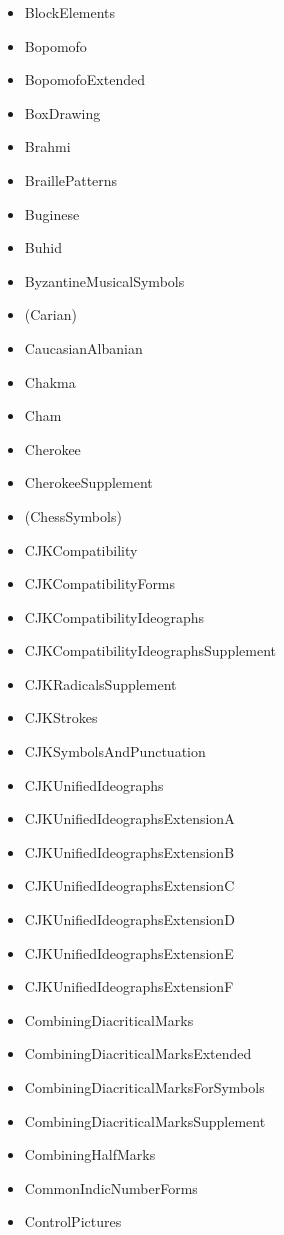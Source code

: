 \documentclass{article}
\newenvironment{itemlist}{%
  \begin{itemize}
	\setlength{\itemsep}{0pt}
	\setlength{\parsep}{0pt}
	\setlength{\topsep}{0pt}
	\setlength{\partopsep}{0pt}
	\setlength{\parskip}{0pt}
	\setlength{\labelsep}{5pt}}%
{
  \end{itemize}}
\begin{document}
\begin{multicols*}{2}
\begin{itemlist}
				\item BlockElements
				\item Bopomofo
				\item BopomofoExtended
				\item BoxDrawing
				\item Brahmi
				\item BraillePatterns
				\item Buginese
				\item Buhid
				\item ByzantineMusicalSymbols
				\item (Carian)
				\item CaucasianAlbanian
				\item Chakma
				\item Cham
				\item Cherokee
				\item CherokeeSupplement
				\item (ChessSymbols)
				\item CJKCompatibility
				\item CJKCompatibilityForms
				\item CJKCompatibilityIdeographs
				\item CJKCompatibilityIdeographsSupplement
				\item CJKRadicalsSupplement
				\item CJKStrokes
				\item CJKSymbolsAndPunctuation
				\item CJKUnifiedIdeographs
				\item CJKUnifiedIdeographsExtensionA
				\item CJKUnifiedIdeographsExtensionB
				\item CJKUnifiedIdeographsExtensionC
				\item CJKUnifiedIdeographsExtensionD
				\item CJKUnifiedIdeographsExtensionE
				\item CJKUnifiedIdeographsExtensionF
				\item CombiningDiacriticalMarks
				\item CombiningDiacriticalMarksExtended
				\item CombiningDiacriticalMarksForSymbols
				\item CombiningDiacriticalMarksSupplement
				\item CombiningHalfMarks
				\item CommonIndicNumberForms
				\item ControlPictures

\end{itemlist}
\end{multicols*}
\end{document}
